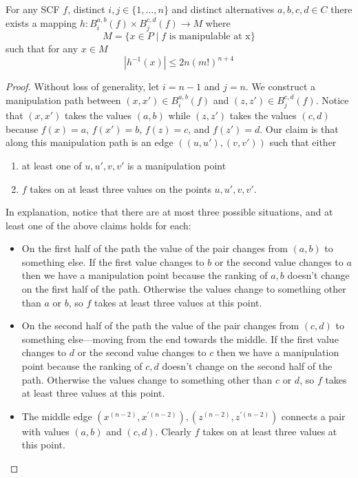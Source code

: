	\begin{lemma}
		For any SCF $f$, distinct $i, j \in \{1, \ldots, n\}$ and distinct alternatives $a, b, c, d \in C$ there exists a mapping $h : B_i^{a,b}(f) \times B_j^{c,d}(f) \rightarrow M$ where
		\[
			M = \{x \in P \mid f \text{ is manipulable at x}\}
		\]
		such that for any $x \in M$
		\[
			|h^{-1}(x)| \le 2n(m!)^{n+4}
		\]
	\end{lemma}
	\begin{proof}
		Without loss of generality, let $i = n - 1$ and $j = n$. We construct a manipulation path between $(x, x') \in B_i^{a,b}(f)$ and $(z, z') \in B_j^{c,d}(f)$. Notice that $(x, x')$ takes the values $(a, b)$ while $(z, z')$ takes the values $(c, d)$ because $f(x) = a$, $f(x') = b$, $f(z) = c$, and $f(z') = d$. Our claim is that along this manipulation path is an edge $((u, u'), (v, v'))$ such that either
		\begin{enumerate}
			\item at least one of $u, u', v, v'$ is a manipulation point
			\item $f$ takes on at least three values on the points $u, u', v, v'$.
		\end{enumerate}
		In explanation, notice that there are at most three possible situations, and at least one of the above claims holds for each:
		\begin{itemize}
			\item On the first half of the path the value of the pair changes from $(a, b)$ to something else. If the first value changes to $b$ or the second value changes to $a$ then we have a manipulation point because the ranking of $a, b$ doesn't change on the first half of the path. Otherwise the values change to something other than $a$ or $b$, so $f$ takes at least three values at this point.
			\item On the second half of the path the value of the pair changes from $(c, d)$ to something else---moving from the end towards the middle. If the first value changes to $d$ or the second value changes to $c$ then we have a manipulation point because the ranking of $c, d$ doesn't change on the second half of the path. Otherwise the values change to something other than $c$ or $d$, so $f$ takes at least three values at this point.
			\item The middle edge $(x^{(n-2)}, x^{\prime(n-2)}), (z^{(n-2)}, z^{\prime(n-2)})$ connects a pair with values $(a, b)$ and $(c, d)$. Clearly $f$ takes on at least three values at this point.
		\end{itemize}


\end{proof}
